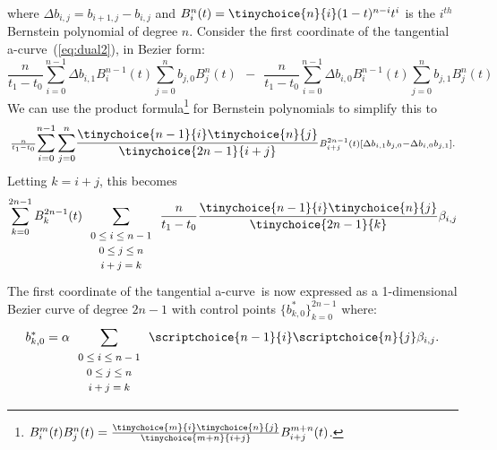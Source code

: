 \documentclass[12pt]{article}
\newcommand{\atang}{tangential a-curve\ }
\begin{document}
where $\Delta b_{i,j} = b_{i+1,j} - b_{i,j}$ and
$B_i^n(t) = \tinychoice{n}{i} (1-t)^{n-i} t^i$ is the $i^{th}$ Bernstein
polynomial of degree $n$.
Consider the first coordinate of the \atang (\ref{eq:dual2}), in Bezier form:
\[
\scriptstyle{\frac{n}{t_1-t_0}}
\displaystyle{\sum_{i=0}^{n-1}} \scriptstyle{\Delta b_{i,1} B_i^{n-1}(t)}
\displaystyle{\sum_{j=0}^n}     \scriptstyle{       b_{j,0} B_j^n(t)}
\ \  - \ \ 
\scriptstyle{\frac{n}{t_1-t_0}}
\displaystyle{\sum_{i=0}^{n-1}} \scriptstyle{\Delta b_{i,0} B_i^{n-1}(t)}
\displaystyle{\sum_{j=0}^n}	\scriptstyle{       b_{j,1} B_j^n(t)}
\]
We can use the product formula\footnote{$B_i^m(t) B_j^n(t) = \frac{ \tinychoice{m}{i} \tinychoice{n}{j} }{ \tinychoice{m+n}{i+j} } B_{i+j}^{m+n}(t)$.}
for Bernstein polynomials \cite{farin97} to simplify this to
\[
\scriptstyle{\frac{n}{t_1-t_0}}
\displaystyle{\sum_{i=0}^{n-1} \sum_{j=0}^n }
\frac{\tinychoice{n-1}{i} \tinychoice{n}{j}}{ \tinychoice{2n-1}{i+j} } 
\scriptstyle{ B_{i+j}^{2n-1}(t) [ \Delta b_{i,1} b_{j,0} - \Delta b_{i,0} b_{j,1} ]}.
\]
Letting $k=i+j$, this becomes
\[
\sum_{k=0}^{2n-1} B_k^{2n-1}(t) 
\sum_{\begin{array}{c} \mbox{\footnotesize{$0 \leq i \leq n-1$}} \\ 
			     \mbox{\footnotesize{$0 \leq j \leq n$}} \\ 
			     \mbox{\footnotesize{$i+j=k$}}
			     \end{array}}
\frac{n}{t_1-t_0} \frac{ \tinychoice{n-1}{i} \tinychoice{n}{j} }{ \tinychoice{2n-1}{k} }
\beta_{i,j}
\]
The first coordinate of the \atang is now expressed as a 1-dimensional Bezier curve of 
degree $2n-1$ with control points $\{b^*_{k,0} \}_{k=0}^{2n-1}$ where:
\begin{equation}
\label{eq:dualw2}
b^*_{k,0} = \alpha
\sum_{\begin{array}{c} \mbox{\footnotesize{$0 \leq i \leq n-1$}} \\ 
			     \mbox{\footnotesize{$0 \leq j \leq n$}} \\ 
			     \mbox{\footnotesize{$i+j=k$}}
			     \end{array}}
\scriptchoice{n-1}{i} \scriptchoice{n}{j} \beta_{i,j}.
\end{equation}
\end{document}
